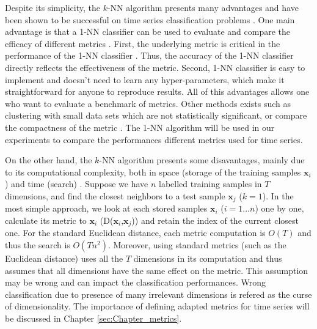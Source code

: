 Despite its simplicity, the $k$-NN algorithm presents many advantages and have been shown to be successful on time series classification problems \cite{Xi2006a,Ding2008}. One main advantage is that a 1-NN classifier can be used to evaluate and compare the efficacy of different metrics \cite{Ding2008}. First, the underlying metric is critical in the performance of the 1-NN classifier \cite{Tan2005b}. Thus, the accuracy of the 1-NN classifier directly reflects the effectiveness of the metric. Second, 1-NN classifier is easy to implement and doesn't need to learn any hyper-parameters, which make it straightforward for anyone to reproduce results. All of this advantages allows one who want to evaluate a benchmark of metrics. Other methods exists such as clustering with small data sets which are not statistically significant, or compare the compactness of the metric . The 1-NN algorithm will be used in our experiments to compare the performances different metrics used for time series.

On the other hand, the $k$-NN algorithm presents some disavantages, mainly due to its computational complexity, both in space (storage of the training samples $\textbf{x}_i$) and time (search) \cite{Duda1973}. Suppose we have $n$ labelled training samples in $T$ dimensions, and find the closest neighbors to a test sample $\textbf{x}_j$ ($k = 1$). In the most simple approach, we look at each stored samples $\textbf{x}_i$ ($i=1...n$) one by one, calculate its metric to $\textbf{x}_i$ (D($\textbf{x}_i$,$\textbf{x}_j$)) and retain the index of the current closest one. For the standard Euclidean distance, each metric computation is $O(T)$ and thus the search is $O(Tn^2)$. Moreover, using standard metrics (such as the Euclidean distance) uses all the $T$ dimensions in its computation and thus assumes that all dimensions have the same effect on the metric. This assumption may be wrong and can impact the classification performances. Wrong classification due to presence of many irrelevant dimensions is refered as the curse of dimensionality. The importance of defining adapted metrics for time series will be discussed in Chapter \ref{sec:Chapter_metrics}.


